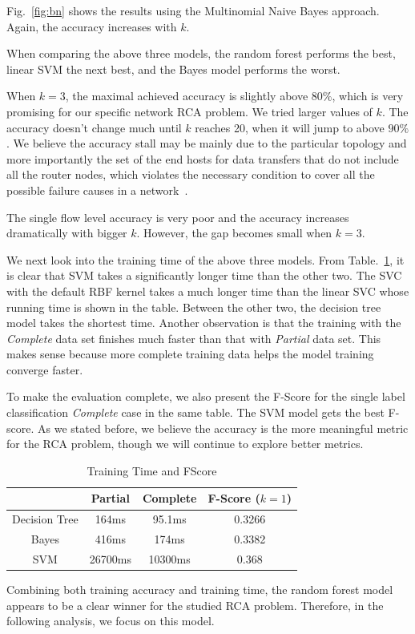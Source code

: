 Fig.~\ref{fig:bn} shows the results using the Multinomial Naive Bayes approach. Again, the accuracy increases with $k$.

When comparing the above three models, the random forest performs the best, linear SVM the next best, and the Bayes model performs the worst. 

When $k=3$, the maximal achieved accuracy is slightly above $80\%$, which is very promising for our specific network RCA problem. We tried larger values of $k$. The accuracy doesn't change much until $k$ reaches 20, when it will jump to above $90\%$. We believe the accuracy stall may be mainly due to the particular topology and more importantly the set of the end hosts for data transfers that do not include all the router nodes, which violates the necessary condition to cover all the possible failure causes in a network~\cite{netbouncer:nsdi18}.  

The single flow level accuracy is very poor and the accuracy increases dramatically with bigger $k$. However, the gap becomes small when $k=3$. 


We next look into the training time of the above three models. From Table.~\ref{tab:time}, it is clear that SVM takes a significantly longer time than the other two. The SVC with the default RBF kernel takes a much longer time than the linear SVC whose running time is shown in the table. Between the other two, the decision tree model takes the shortest time. Another observation is that the training with the {\it Complete} data set finishes much faster than that with {\it Partial} data set. This makes sense because more complete training data helps the model training converge faster. 

To make the evaluation complete, we also present the F-Score for the single label classification {\it Complete} case in the same table. The SVM model gets the best F-score. As we stated before, we believe the accuracy is the more meaningful metric for the RCA problem, though we will continue to explore better metrics.     
\begin{table}[!ht]
\caption{Training Time and F\-Score}
\label{tab:time}
\begin{center}
\begin{tabular}{ |c|c|c|c| } 
 \hline
  & Partial & Complete & F-Score ($k=1$)\\ 
 \hline\hline
 Decision Tree & 164ms & 95.1ms & 0.3266\\ 
 \hline
 Bayes & 416ms & 174ms & 0.3382 \\
 \hline
 SVM & 26700ms & 10300ms & 0.368 \\ 
 \hline
\end{tabular}
\end{center}
\end{table}
Combining both training accuracy and training time, the random forest model appears to be a clear winner for the studied RCA problem. Therefore, in the following analysis, we focus on this model.

